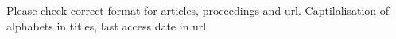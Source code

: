 \documentclass[12pt,a4paper]{report}
\begin{document}
\clearpage
\label{whatever}
\clearpage
Please check correct format for articles, proceedings and url.
Captilalisation of alphabets in titles, last access date in url

 
\end{document}
